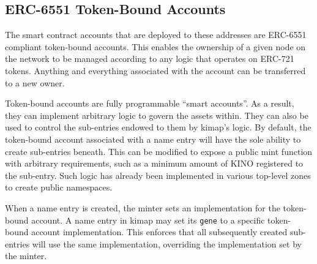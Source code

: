 \documentclass[runningheads]{llncs}
\begin{document}
\subsection{ERC-6551 Token-Bound Accounts}

The smart contract accounts that are deployed to these addresses are ERC-6551 compliant token-bound accounts.
This enables the ownership of a given node on the network to be managed according to any logic that operates on ERC-721 tokens.
Anything and everything associated with the account can be transferred to a new owner.

Token-bound accounts are fully programmable ``smart accounts''.
As a result, they can implement arbitrary logic to govern the assets within.
They can also be used to control the sub-entries endowed to them by kimap's logic.
By default, the token-bound account associated with a name entry will have the sole ability to create sub-entries beneath.
This can be modified to expose a public mint function with arbitrary requirements, such as a minimum amount of KINO registered to the sub-entry.
Such logic has already been implemented in various top-level zones to create public namespaces.

When a name entry is created, the minter sets an implementation for the token-bound account.
A name entry in kimap may set its \verb|gene| to a specific token-bound account implementation.
This enforces that all subsequently created sub-entries will use the same implementation, overriding the implementation set by the minter.


\end{document}
